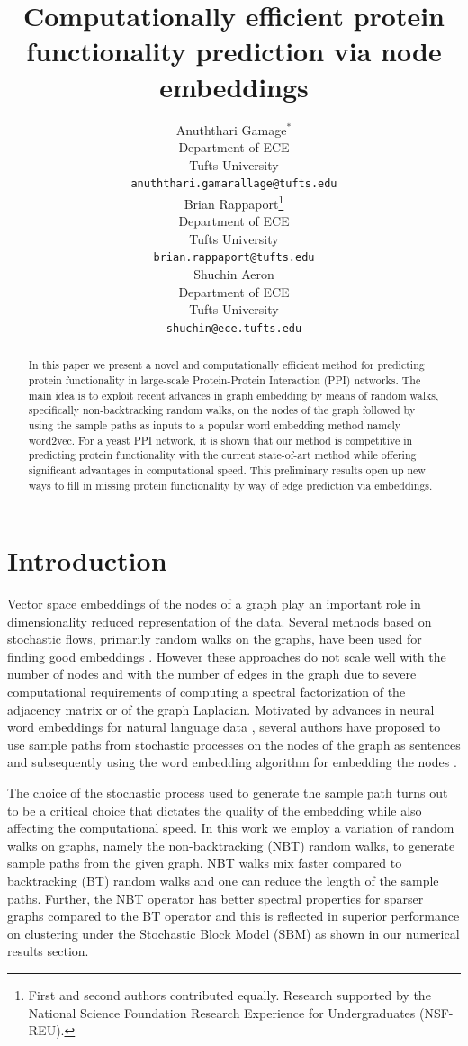 \documentclass{article} %
\title{Computationally efficient protein functionality prediction via node embeddings}
\author{
Anuththari Gamage$^*$ \\
Department of ECE\\
Tufts University\\
\texttt{anuththari.gamarallage@tufts.edu} \\
\And
Brian Rappaport\thanks{First and second authors contributed equally. Research supported by the National Science Foundation Research Experience for Undergraduates (NSF-REU).} \\
Department of ECE\\
Tufts University\\
\texttt{brian.rappaport@tufts.edu} \\
\AND
Shuchin Aeron \\
Department of ECE\\
Tufts University\\
\texttt{shuchin@ece.tufts.edu} 
}
\begin{document}
\maketitle

\begin{abstract}
In this paper we present a novel and computationally efficient method for predicting protein functionality in large-scale Protein-Protein Interaction (PPI) networks. The main idea is to exploit recent advances in graph embedding by means of random walks, specifically non-backtracking random walks, on the nodes of the graph followed by using the sample paths as inputs to a popular word embedding method namely word2vec. For a yeast PPI network, it is shown that our method is competitive in predicting protein functionality with the current state-of-art method while offering significant advantages in computational speed. This preliminary results open up new ways to fill in missing protein functionality by way of edge prediction via embeddings. 
\end{abstract}

\section{Introduction}

Vector space embeddings of the nodes of a graph play an important role in dimensionality reduced representation of the data. Several methods based on stochastic flows, primarily random walks on the graphs, have been used for finding good embeddings  \cite{Belkin:2001wy,Lawrence:2012tj,Talmon:2013ko,Singer:2012tf}. However these approaches do not scale well with the number of nodes and with the number of edges in the graph due to severe computational requirements of computing a spectral factorization of the adjacency matrix or of the graph Laplacian. Motivated by advances in neural word embeddings for natural language data \cite{Levy:2014vd,word2vec}, several authors have proposed to use sample paths from stochastic processes on the nodes of the graph as sentences and subsequently using the word embedding algorithm for embedding the nodes \cite{2014arXiv1403.6652P,Grover:2016ex,2015arXiv150905808H,NodeEmbed}. 

The choice of the stochastic process used to generate the sample path turns out to be a critical choice that dictates the quality of the embedding while also affecting the computational speed. In this work we employ a variation of random walks on graphs, namely the non-backtracking (NBT) random walks, to generate sample paths from the given graph. NBT walks mix faster compared to backtracking (BT) random walks \cite{Alon} and one can reduce the length of the sample paths. Further, the NBT operator has better spectral properties for sparser graphs compared to the BT operator \cite{Redemption} and this is reflected in superior performance on clustering under the Stochastic Block Model (SBM) as shown in our numerical results section.
\end{document}
